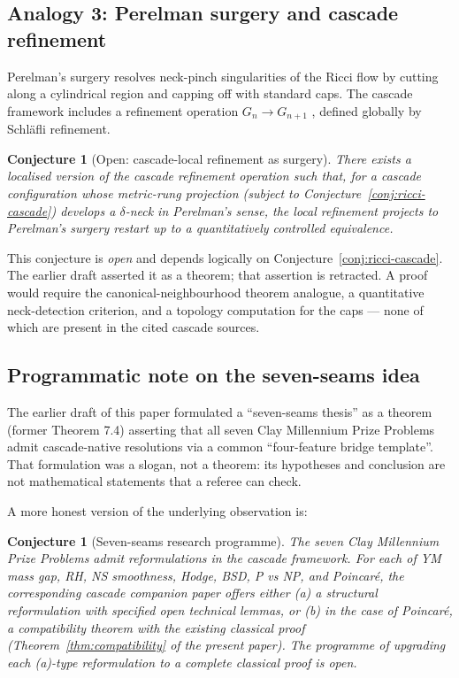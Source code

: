 \documentclass[11pt, a4paper]{amsart}
\newtheorem{conjecture}[theorem]{Conjecture}
\theoremstyle{definition}
\begin{document}
\subsection{Analogy 3: Perelman surgery and cascade refinement}

Perelman's surgery resolves neck-pinch singularities of the Ricci
flow by cutting along a cylindrical region and capping off with
standard caps. The cascade framework includes a refinement
operation $G_{n} \to G_{n+1}$ \cite[\S C2.bis]{CascadeGR}, defined
globally by Schl\"{a}fli refinement.

\begin{conjecture}[Open: cascade-local refinement as surgery]
\label{conj:surgery-cascade}
There exists a localised version of the cascade refinement
operation such that, for a cascade configuration whose
metric-rung projection (subject to Conjecture~\ref{conj:ricci-cascade})
develops a $\delta$-neck in Perelman's sense, the local refinement
projects to Perelman's surgery restart up to a quantitatively
controlled equivalence.
\end{conjecture}

\noindent
This conjecture is \emph{open} and depends logically on
Conjecture~\ref{conj:ricci-cascade}. The earlier draft asserted it
as a theorem; that assertion is retracted. A proof would require
the canonical-neighbourhood theorem analogue, a quantitative
neck-detection criterion, and a topology computation for the
caps --- none of which are present in the cited cascade sources.

\subsection{Programmatic note on the seven-seams idea}

The earlier draft of this paper formulated a ``seven-seams thesis''
as a theorem (former Theorem 7.4) asserting that all seven Clay
Millennium Prize Problems admit cascade-native resolutions via a
common ``four-feature bridge template''. That formulation was a
slogan, not a theorem: its hypotheses and conclusion are not
mathematical statements that a referee can check.

A more honest version of the underlying observation is:

\begin{conjecture}[Seven-seams research programme]
\label{conj:seven-seams}
The seven Clay Millennium Prize Problems admit reformulations in
the cascade framework. For each of YM mass gap, RH, NS smoothness,
Hodge, BSD, P vs NP, and Poincar\'{e}, the corresponding cascade
companion paper offers either (a) a structural reformulation with
specified open technical lemmas, or (b) in the case of Poincar\'{e},
a compatibility theorem with the existing classical proof
(Theorem~\ref{thm:compatibility} of the present paper). The
programme of upgrading each (a)-type reformulation to a complete
classical proof is open.
\end{conjecture}
\end{document}
